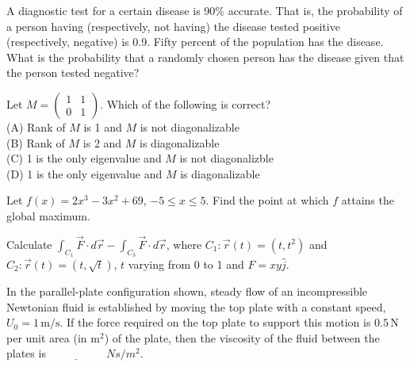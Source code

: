     \item A diagnostic test for a certain disease is 90\% accurate. That is, the probability of a person having (respectively, not having) the disease tested positive (respectively, negative) is 0.9. Fifty percent of the population has the disease. What is the probability that a randomly chosen person has the disease given that the person tested negative?

    \item Let $M = \begin{pmatrix} 1 & 1 \\ 0 & 1 \end{pmatrix}$. Which of the following is correct? \\
    (A) Rank of $M$ is 1 and $M$ is not diagonalizable \\
    (B) Rank of $M$ is 2 and $M$ is diagonalizable \\
    (C) 1 is the only eigenvalue and $M$ is not diagonalizble \\
    (D) 1 is the only eigenvalue and $M$ is diagonalizable

    \item Let $f(x) = 2x^3 - 3x^2 + 69$, $-5 \leq x \leq 5$. Find the point at which $f$ attains the global maximum.

    \item Calculate $\int_{C_1} \vec{F} \cdot d\vec{r} - \int_{C_3} \vec{F} \cdot d\vec{r}$, where $C_1 : \vec{r}(t) = (t, t^2)$ and $C_2 : \vec{r}(t) = (t, \sqrt{t})$, $t$ varying from 0 to 1 and $F = xy \hat{j}$.
\item In the parallel-plate configuration shown, steady flow of an incompressible Newtonian fluid is established by moving the top plate with a constant speed, $U_0 = 1 \, \text{m/s}$. If the force required on the top plate to support this motion is $0.5 \, \text{N}$ per unit area (in $\text{m}^2$) of the plate, then the viscosity of the fluid between the plates is $\underline{\hspace{2cm}}$ $ Ns/m^2$.

